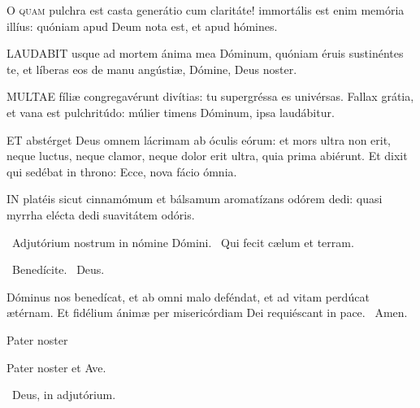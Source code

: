 \lettrine[lines=2]{O}{} \textsc{quam} pulchra est casta generátio cum claritáte! immortális est enim memória illíus: quóniam apud Deum nota est, et apud hómines.


\lettrine[lines=2]{L}{AUDABIT} usque ad mortem ánima mea Dóminum, quóniam éruis sustinéntes te, et líberas eos de manu angústiæ, Dómine, Deus noster.


\lettrine[lines=2]{M}{ULTAE} fíliæ congregavérunt divítias: tu supergréssa es univérsas. Fallax grátia, et vana est pulchritúdo: múlier timens Dóminum, ipsa laudábitur.


\lettrine[lines=2]{E}{T} abstérget Deus omnem lácrimam ab óculis eórum: et mors ultra non erit, neque luctus, neque clamor, neque dolor erit ultra, quia prima abiérunt. Et dixit qui sedébat in throno: Ecce, nova fácio ómnia.


\lettrine[lines=2]{I}{N} platéis sicut cinnamómum et bálsamum aromatízans odórem dedi: quasi myrrha elécta dedi suavitátem odóris.

\V\ Adjutórium nostrum in nómine Dómini. \R\ Qui fecit cælum et terram.

\V\ Benedícite. \R\ Deus.

 Dóminus nos benedícat, et ab omni malo deféndat, et ad vitam perdúcat ætérnam. Et fidélium ánimæ per misericórdiam Dei requiéscant in pace. \R\ Amen.

 Pater noster 

\sectionornament




Pater noster et Ave.

\V\ Deus, in adjutórium.


